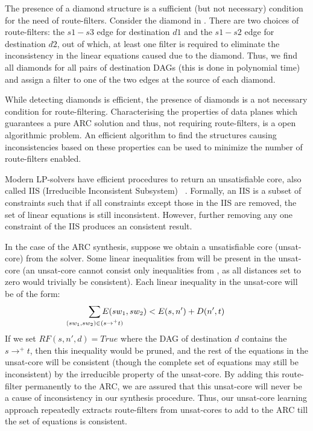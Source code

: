 The presence of a diamond structure is a sufficient (but not 
necessary) condition for the need of route-filters. Consider
the diamond in . There are two choices
of route-filters: the $s1-s3$ edge for destination $d1$ 
and the $s1-s2$ edge for destination $d2$, out of which,
at least one filter is required to eliminate the 
inconsistency in the linear equations caused due to the diamond.
Thus, we find all diamonds for all pairs of destination
DAGs (this is done in polynomial time) and assign a filter
to one of the two edges at the source of each diamond. 

While detecting diamonds is efficient, the
presence of diamonds is a not 
necessary condition for route-filtering.
Characterising the properties of data planes which
guarantees a pure ARC solution and thus, not requiring
route-filters, is a open algorithmic
problem. An 
efficient algorithm to find the structures causing 
inconsistencies based on these properties 
can be used to minimize the number of route-filters enabled.  

Modern LP-solvers have efficient procedures to return an
unsatisfiable core, also called IIS (Irreducible Inconsistent Subsystem)
~\cite{iis}. Formally, an IIS is a subset of constraints such that
if all constraints except those in the IIS are removed, the set of
linear equations is still inconsistent. However, further removing 
any one constraint of the IIS produces an consistent result. 

In the case of the ARC synthesis, suppose we obtain
a unsatisfiable core (unsat-core) from the solver. 
Some linear inequalities 
from  will be present in the unsat-core 
(an unsat-core cannot consist only 
inequalities from , as all distances set to zero
would trivially be consistent). Each linear inequality
in the unsat-core will be of the form:
\begin{eqnarray}
	\sum_{\mathclap{\substack{(sw_1, sw_2) \in (s \rightarrow^+ t)}}} 
		E(sw_1, sw_2) < E(s, n') + D(n', t)  \nonumber
\end{eqnarray}
If we set $RF(s,n',d) = True$ where the DAG of destination $d$
contains the $s \rightarrow^+ t$, then this inequality would be pruned,
and the rest of the equations in the unsat-core will be consistent (though
the complete set of equations may still be inconsistent) by the 
irreducible property of the unsat-core. By adding this route-filter
permanently to the ARC, we are assured that this unsat-core will 
never be a cause of inconsistency in our synthesis procedure. 
Thus, our unsat-core learning approach 
repeatedly extracts route-filters 
from unsat-cores to add to the ARC
till the set of equations is consistent. 

